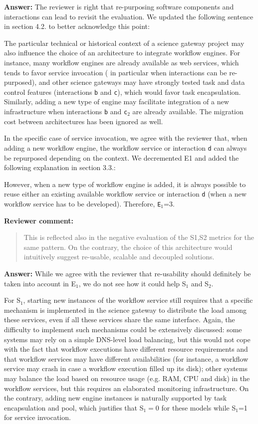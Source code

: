 \documentclass[a4]{letter}
\newenvironment{review}%
{\textbf{Reviewer comment:}\begin{quote}}%
{\end{quote}}%
\newcommand{\answer}[1]{\textbf{Answer:} #1}
\newcommand{\revised}[1]{\color{blue} #1\color{black}}
\begin{document}
\begin{letter}{}
\answer{The reviewer is right that re-purposing software components
  and interactions can lead to revisit the evaluation. We updated the following sentence in section 4.2. to better acknowledge this point:}

The particular technical or historical context of a science gateway
project may also influence the choice of an architecture to
integrate workflow engines. For instance, many workflow engines are
already available as web services, which tends to favor service
invocation (\revised{in particular when interactions can be re-purposed}), and other science gateways may have strongly tested task
and data control features (interactions \texttt{b} and \texttt{c}),
which would favor task encapsulation. Similarly, adding a new type of engine
may facilitate integration of a new infrastructure when interactions
\texttt{b} and \texttt{c$_2$} are already available. The migration
cost between architectures has been ignored as well.

In the specific case of service invocation, we agree with the reviewer
that, when adding a new workflow engine, the workflow service or interaction \texttt{d} can always be repurposed depending on the context. We decremented E1 and added the following explanation in section 3.3.:

\revised{However, when a new type of workflow engine is added, it is always possible to reuse either an existing available workflow service or interaction \texttt{d} (when a new workflow service has to be developed). Therefore, \texttt{E$_1$}=3}.

\begin{review}
 This is reflected also in the negative evaluation of the S1,S2 metrics for the same pattern. On the contrary, the choice of this architecture would intuitively suggest re-usable, scalable and decoupled solutions.
\end{review}

\answer{While we agree with the reviewer that re-usability should
  definitely be taken into account in E$_1$, we do not see how it
  could help S$_1$ and S$_2$.

  For S$_1$, starting new instances of the workflow service still
  requires that a specific mechanism is implemented in the science
  gateway to distribute the load among these services, even if all
  these services share the same interface. Again, the difficulty to
  implement such mechanisms could be extensively discussed: some
  systems may rely on a simple DNS-level load balancing, but this
  would not cope with the fact that workflow executions have different
  resource requirements and that workflow services may have different
  availabilities (for instance, a workflow service may crash in case a
  workflow execution filled up its disk); other systems may balance
  the load based on resource usage (e.g. RAM, CPU and disk) in the
  workflow services, but this requires an elaborated monitoring
  infrastructure. On the contrary, adding new engine instances is
  naturally supported by task encapsulation and pool, which justifies
  that S$_1=0$ for these models while S$_1$=1 for service invocation.

}
\end{letter}
\end{document}
